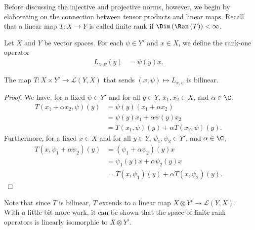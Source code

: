 Before discussing the injective and projective norms, however, we begin by elaborating on the connection between tensor products and linear maps. Recall that a linear map $T\colon X\rightarrow Y$ is called finite rank if $\Dim\left( \Ran\left( T \right) \right) < \infty$.
\begin{definition}
  Let $X$ and $Y$ be vector spaces. For each $\psi \in Y'$ and $x\in X$, we define the rank-one operator
  \begin{align*}
    L_{x,\psi}\left( y \right) &= \psi\left( y \right)x.
  \end{align*}
\end{definition}
\begin{fact}
  The map $T\colon X\times Y'\rightarrow \mathcal{L}\left( Y,X \right)$ that sends $\left( x,\psi \right)\mapsto L_{x,\psi}$ is bilinear.
\end{fact}
\begin{proof}
  We have, for a fixed $\psi\in Y'$ and for all $y\in Y$, $x_1,x_2\in X$, and $\alpha\in\C$,
  \begin{align*}
    T\left( x_1 + \alpha x_2,\psi \right)(y) &= \psi\left( y \right)\left( x_1 + \alpha x_2 \right)\\
                                             &= \psi\left( y \right)x_1 + \alpha \psi\left( y \right)x_2\\
                                             &= T\left( x_1,\psi \right)\left( y \right) + \alpha T\left( x_2,\psi \right)\left( y \right).
  \end{align*}
  Furthermore, for a fixed $x\in X$ and for all $y\in Y$, $\psi_1,\psi_2\in Y'$, and $\alpha\in \C$,
  \begin{align*}
    T\left( x,\psi_1 + \alpha \psi_2 \right)\left( y \right) &= \left( \psi_1 + \alpha \psi_2 \right)\left( y \right)x\\
                                                             &= \psi_1\left( y \right)x + \alpha \psi_2\left( y \right)x\\
                                                             &= T\left( x,\psi_1 \right)\left( y \right) + \alpha T\left( x,\psi_2 \right)\left( y \right).
  \end{align*}
\end{proof}
Note that since $T$ is bilinear, $T$ extends to a linear map $X\otimes Y' \rightarrow \mathcal{L}\left( Y,X \right)$. With a little bit more work, it can be shown that the space of finite-rank operators is linearly isomorphic to $X\otimes Y'$.\newline

